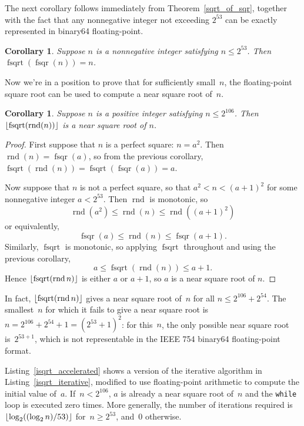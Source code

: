 \documentclass[a4paper]{article}
\DeclarePairedDelimiter\floor{\lfloor}{\rfloor}
\DeclareMathOperator{\rnd}{rnd}
\DeclareMathOperator{\fsqrt}{fsqrt}
\DeclareMathOperator{\fsqr}{fsqr}
\theoremstyle{plain}
\newtheorem{corollary}[theorem]{Corollary}
\theoremstyle{definition}
\begin{document}
The next corollary follows immediately from Theorem~\ref{sqrt_of_sqr}, together
with the fact that any nonnegative integer not exceeding $2^{53}$ can be
exactly represented in binary64 floating-point.

\begin{corollary}
  Suppose $n$ is a nonnegative integer satisfying $n \le 2^{53}$. Then
  $\fsqrt(\fsqr(n)) = n$.
\end{corollary}

Now we're in a position to prove that for sufficiently small~$n$, the
floating-point square root can be used to compute a near square root of~$n$.

\begin{corollary}
  Suppose $n$ is a positive integer satisfying $n \le 2^{106}$. Then
  $\floor{\fsqrt(\rnd(n))}$ is a near square root of $n$.
\end{corollary}

\begin{proof}
  First suppose that $n$ is a perfect square: $n = a^2$. Then $\rnd(n) =
  \fsqr(a)$, so from the previous corollary, $\fsqrt(\rnd(n)) =
  \fsqrt(\fsqr(a)) = a$.

  Now suppose that $n$ is not a perfect square, so that $a^2 < n < (a+1)^2$
  for some nonnegative integer $a < 2^{53}$. Then $\rnd$ is monotonic, so
    $$\rnd(a^2) \le \rnd(n) \le \rnd((a+1)^2)$$
  or equivalently,
    $$\fsqr(a) \le \rnd(n) \le \fsqr(a+1).$$
  Similarly, $\fsqrt$ is monotonic, so applying $\fsqrt$ throughout
  and using the previous corollary,
    $$a \le \fsqrt(\rnd(n)) \le a + 1.$$
  Hence $\floor{\fsqrt(\rnd n)}$ is either $a$ or $a+1$, so $a$ is a near
  square root of $n$.
\end{proof}

In fact, $\floor{\fsqrt(\rnd n)}$ gives a near square root of~$n$ for all $n
\le 2^{106} + 2^{54}$. The smallest~$n$ for which it fails to give a near
square root is $n = 2^{106} + 2^{54} + 1 = (2^{53} + 1)^2$: for this~$n$,
the only possible near square root is~$2^{53 + 1}$, which is not representable
in the IEEE 754 binary64 floating-point format.

Listing~\ref{isqrt_accelerated} shows a version of the iterative
algorithm in Listing~\ref{isqrt_iterative}, modified to use floating-point
arithmetic to compute the initial value of~$a$.  If~$n < 2^{106}$,
$a$ is already a near square root of~$n$ and the \lstinline$while$ loop is
executed zero times. More generally, the number of iterations required
is~$\floor{\log_2((\log_2n)/53)}$ for~$n \ge 2^{53}$, and~$0$ otherwise.
\end{document}
